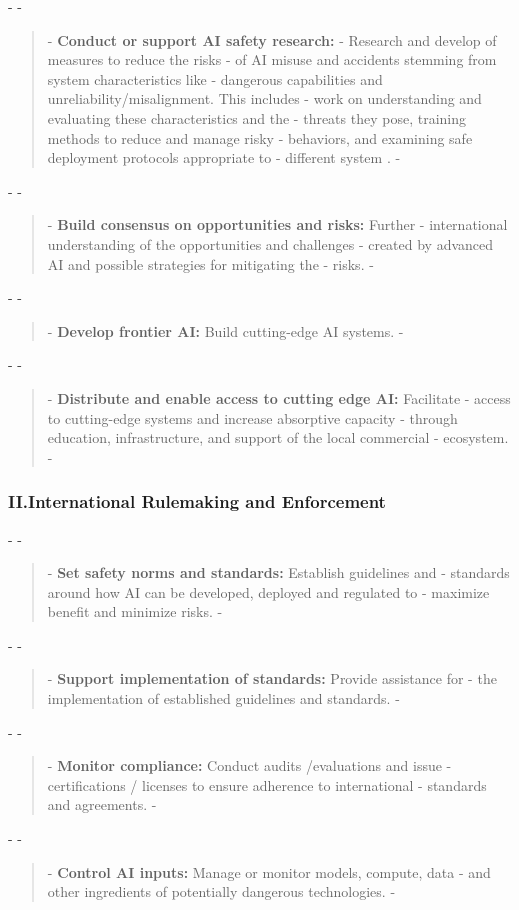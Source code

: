 \documentclass[12pt]{article}
\begin{document}
- 
- \begin{quote}
- \textbf{Conduct or support AI safety research:}
- Research and develop of measures to reduce the risks
- of AI misuse and accidents stemming from system characteristics like
- dangerous capabilities and unreliability/misalignment. This includes
- work on understanding and evaluating these characteristics and the
- threats they pose, training methods to reduce and manage risky
- behaviors, and examining safe deployment protocols appropriate to
- different system \cite{amodei_concrete_2016, hendrycks_unsolved_2022}.
- \end{quote}
- 
- \begin{quote}
- \textbf{Build consensus on opportunities and risks:} Further
- international understanding of the opportunities and challenges
- created by advanced AI and possible strategies for mitigating the
- risks.
- \end{quote}
- 
- \begin{quote}
- \textbf{Develop frontier AI:} Build cutting-edge AI systems.
- \end{quote}
- 
- \begin{quote}
- \textbf{Distribute and enable access to cutting edge AI:} Facilitate
- access to cutting-edge systems and increase absorptive capacity
- through education, infrastructure, and support of the local commercial
- ecosystem.
- \end{quote}

\subsubsection*{II.\quad International Rulemaking and Enforcement}

- 
- \begin{quote}
- \textbf{Set safety norms and standards:} Establish guidelines and
- standards around how AI can be developed, deployed and regulated to
- maximize benefit and minimize risks.
- \end{quote}
- 
- \begin{quote}
- \textbf{Support implementation of standards:} Provide assistance for
- the implementation of established guidelines and standards.
- \end{quote}
- 
- \begin{quote}
- \textbf{Monitor compliance:} Conduct audits /evaluations and issue
- certifications / licenses to ensure adherence to international
- standards and agreements.
- \end{quote}
- 
- \begin{quote}
- \textbf{Control AI inputs:} Manage or monitor models, compute, data
- and other ingredients of potentially dangerous technologies.
- \end{quote}
\end{document}
